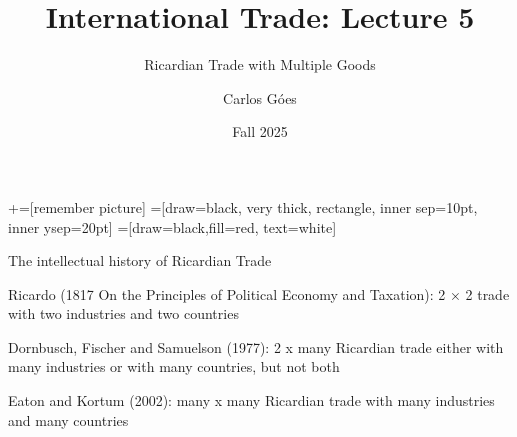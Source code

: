 \documentclass[notes,11pt, aspectratio=169, xcolor=table]{beamer}
\title[]{International Trade: Lecture 5}
\subtitle[]{Ricardian Trade with Multiple Goods}
\author[Góes]
{Carlos Góes\inst{1}}
\date{Fall 2025}
\institute[GWU]{\inst{1} George Washington University }
\newenvironment{wideitemize}{\itemize\addtolength{\itemsep}{10pt}}{\enditemize}
\begin{document}
\newcommand\marktopleft[1]{%
    \tikz[overlay,remember picture] 
        \node (marker-#1-a) at (-.3em,.3em) {};%
}
\newcommand\markbottomright[2]{%
    \tikz[overlay,remember picture] 
        \node (marker-#1-b) at (0em,0em) {};%
}
+=[remember picture] 
 =[draw=black, very thick, rectangle, inner sep=10pt, inner ysep=20pt]
 =[draw=black,fill=red, text=white]















\frame{\titlepage}
\addtocounter{framenumber}{-1}




\begin{frame}{The intellectual history of Ricardian Trade}
\begin{wideitemize}
        \item<1-> Ricardo (1817 On the Principles of Political Economy and Taxation): 2 × 2 trade with two industries and two countries
        \item<2-> Dornbusch, Fischer and Samuelson (1977): 2 x many Ricardian trade either with many industries or with many countries, but not both
        \item<3-> Eaton and Kortum (2002): many x many Ricardian trade with many industries and many countries
        \end{wideitemize}
\end{frame}
\end{document}
